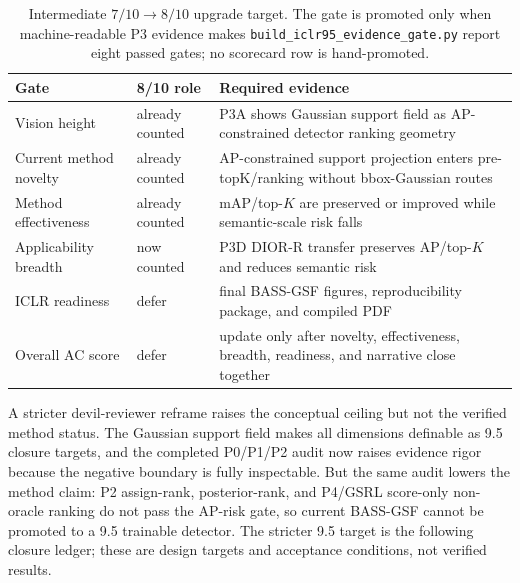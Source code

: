 \documentclass[10pt]{article}
\begin{document}
\begin{table}[h]
\centering
\small
\begin{tabular}{lll}
\toprule
Gate & 8/10 role & Required evidence \\
\midrule
Vision height & already counted & P3A shows Gaussian support field as AP-constrained detector ranking geometry \\
Current method novelty & already counted & AP-constrained support projection enters pre-topK/ranking without bbox-Gaussian routes \\
Method effectiveness & already counted & mAP/top-$K$ are preserved or improved while semantic-scale risk falls \\
Applicability breadth & now counted & P3D DIOR-R transfer preserves AP/top-$K$ and reduces semantic risk \\
ICLR readiness & defer & final BASS-GSF figures, reproducibility package, and compiled PDF \\
Overall AC score & defer & update only after novelty, effectiveness, breadth, readiness, and narrative close together \\
\bottomrule
\end{tabular}
\caption{Intermediate $7/10 \rightarrow 8/10$ upgrade target.  The gate is
promoted only when machine-readable P3 evidence makes
\texttt{build\_iclr95\_evidence\_gate.py} report eight passed gates; no
scorecard row is hand-promoted.}
\end{table}

A stricter devil-reviewer reframe raises the conceptual ceiling but not the
verified method status.  The Gaussian support field makes all dimensions
definable as 9.5 closure targets, and the completed P0/P1/P2 audit now raises
evidence rigor because the negative boundary is fully inspectable.  But the
same audit lowers the method claim: P2 assign-rank, posterior-rank, and P4/GSRL
score-only non-oracle ranking do not pass the AP-risk gate, so current BASS-GSF
cannot be promoted to a 9.5 trainable detector.  The
stricter 9.5 target is the following
closure ledger; these are design targets and acceptance conditions, not
verified results.
\end{document}
